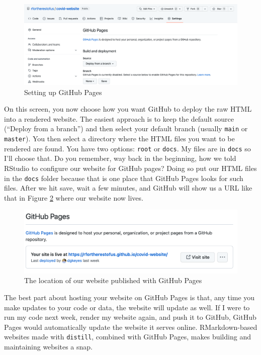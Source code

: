 \documentclass[
]{book}
\begin{document}
\begin{figure}
\includegraphics[width=1\linewidth]{assets/gh-pages} \caption{Setting up GitHub Pages}\label{fig:gh-pages}
\end{figure}

On this screen, you now choose how you want GitHub to deploy the raw HTML into a rendered website. The easiest approach is to keep the default source (``Deploy from a branch'') and then select your default branch (usually \texttt{main} or \texttt{master}). You then select a directory where the HTML files you want to be rendered are found. You have two options: \texttt{root} or \texttt{docs}. My files are in \texttt{docs} so I'll choose that. Do you remember, way back in the beginning, how we told RStudio to configure our website for GitHub pages? Doing so put our HTML files in the \texttt{docs} folder because that is one place that GitHub Pages looks for such files. After we hit save, wait a few minutes, and GitHub will show us a URL like that in Figure \ref{fig:gh-pages-published} where our website now lives.

\begin{figure}
\includegraphics[width=1\linewidth]{assets/gh-pages-published} \caption{The location of our website published with GitHub Pages}\label{fig:gh-pages-published}
\end{figure}

The best part about hosting your website on GitHub Pages is that, any time you make updates to your code or data, the website will update as well. If I were to run my code next week, render my website again, and push it to GitHub, GitHub Pages would automatically update the website it serves online. RMarkdown-based websites made with \texttt{distill}, combined with GitHub Pages, makes building and maintaining websites a snap.
\end{document}
